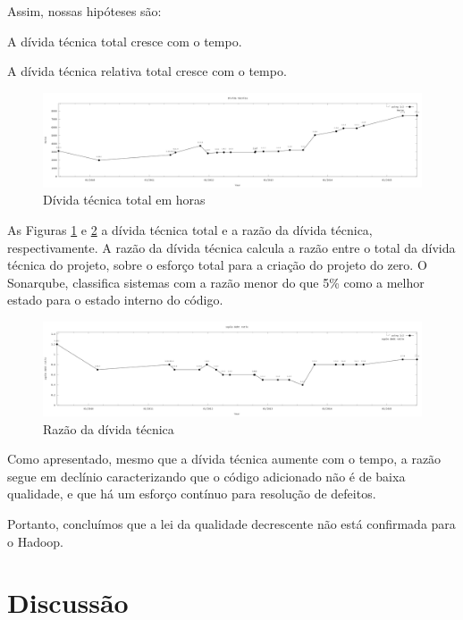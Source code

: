 Assim, nossas hipóteses são:
\begin{hypothesis}
	A dívida técnica total cresce com o tempo.
\end{hypothesis}
\begin{hypothesis}
	A dívida técnica relativa total cresce com o tempo.
\end{hypothesis}
\begin{figure}[h]
	\centering
	\includegraphics[width=0.7\linewidth]{figure/Horas}
	\caption{Dívida técnica total em horas}
	\label{fig:horas}
\end{figure}

As Figuras \ref{fig:horas} e \ref{fig:sqaledebtratio} a dívida técnica total e a razão da dívida técnica, respectivamente. A razão da dívida técnica calcula a razão entre o total da dívida técnica do projeto, sobre o esforço total para a criação do projeto do zero. O Sonarqube, classifica sistemas com a razão menor do que 5\% como a melhor estado para o estado interno do código. 
\begin{figure}[h]
	\centering
	\includegraphics[width=0.7\linewidth]{figure/sqale_debt_ratio}
	\caption{Razão da dívida técnica}
	\label{fig:sqaledebtratio}
\end{figure}
Como apresentado, mesmo que a dívida técnica aumente com o tempo, a razão segue em declínio caracterizando que o código adicionado não é de baixa qualidade, e que há um esforço contínuo para resolução de defeitos.

Portanto, concluímos que a lei da qualidade decrescente não está confirmada para o Hadoop.

%
%

\section{Discussão}


